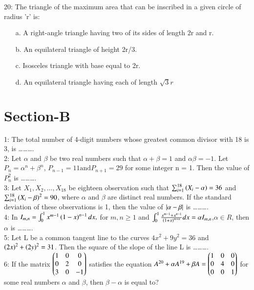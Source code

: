 \documentclass[journal,12pt,twocolumn]{IEEEtran}
\theoremstyle{remark}
\begin{document}
20: The triangle of the maximum area that can be inscribed in a given circle of radius 'r' is:
\begin{enumerate}
    \item [a.] A right-angle triangle having two of its sides of length 2r and r.
    \item [b.] An equilateral triangle of height 2r/3.
    \item [c.] Isosceles triangle with base equal to 2r.
    \item [d.] An equilateral triangle having each of length $\sqrt{3}r$
\end{enumerate}
\section{Section-B}
1: The total number of 4-digit numbers whose greatest common divisor with 18 is 3, is \ldots\ldots\ldots.\vspace{0.5mm}\\
2: Let $\alpha$ and $\beta$ be two real numbers such that $\alpha + \beta = 1$ and $\alpha\beta = -1$. Let $P_n = \alpha^n + \beta^n$, $P_{n-1} = 11 \text{and} P_{n+1} = 29$ for some integer n = 1. Then the value of $P_n ^2$ is \ldots\ldots\ldots.\vspace{0.5mm}\\
3: Let $X_1,X_2,\ldots,X_{18}$ be eighteen observation such that $\sum_{i=1} ^{18} \left(X_i - \alpha\right) = 36$ and $\sum_{i=1} ^{18} \left(X_i - \beta\right)^2 = 90$, where $\alpha$ and $\beta$ are distinct real numbers. If the standard deviation of these observations is 1, then the value of $\left\vert\alpha - \beta\right\vert$ is \ldots\ldots\ldots.\vspace{0.5mm} \\ 
4: In $I_{m,n} = \int _0 ^1 x^{m-1}\left(1-x\right)^{n-1}dx,$ for $m,n\geq1$ and $\int _0 ^1\frac{x^{m-1} + x^{n-1}}{\left(1+x\right)^{m+n}}dx = \alpha I_{m,n}$,$\alpha \in R$, then $\alpha$ is \ldots\ldots\ldots. \vspace{0.5mm}\\
5: Let L be a common tangent line to the curves $4x^2 + 9y^2 = 36$ and $\left(2x\right)^2 + \left(2y\right)^2=31$. Then the square of the slope of the line L is \ldots\ldots\ldots.\vspace{0.5mm}\\
6: If the matrix $\begin{pmatrix}1&0&0\\0&2&0\\3&0&-1\end{pmatrix}$
satisfies the equation $A^{20} + \alpha A^{19} + \beta A = \begin{pmatrix}1&0&0\\0&4&0\\0&0&1\end{pmatrix}$ for some real numbers $\alpha$ and $\beta$, then $\beta - \alpha$ is equal to?\vspace{0.5mm}\\
\end{document}
